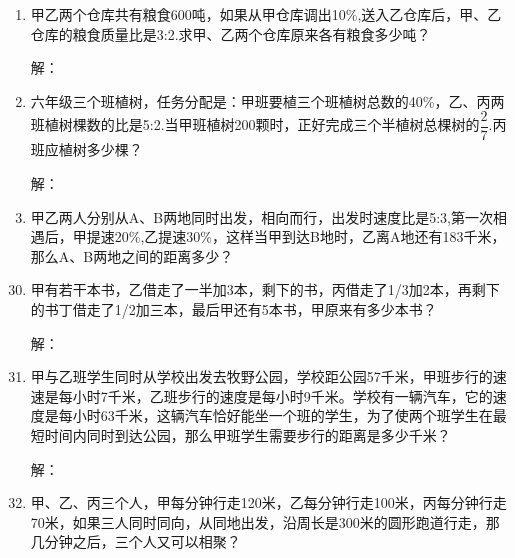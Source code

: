 \documentclass[twocolumn,landscape,UTF8]{ctexart}
\begin{document}
\begin{spacing}{1.3}
\begin{enumerate}
			\item 甲乙两个仓库共有粮食600吨，如果从甲仓库调出10\%,送入乙仓库后，甲、乙仓库的粮食质量比是3:2.求甲、乙两个仓库原来各有粮食多少吨？
			
           解：
            \vspace{3.5cm}
            
            \item 六年级三个班植树，任务分配是：甲班要植三个班植树总数的40\%，乙、丙两班植树棵数的比是5:2.当甲班植树200颗时，正好完成三个半植树总棵树的$\dfrac{2}{7}$.丙班应植树多少棵？

           解：
            \vspace{3.5cm}
            
            \item  甲乙两人分别从A、B两地同时出发，相向而行，出发时速度比是5:3,第一次相遇后，甲提速20\%,乙提速30\%，这样当甲到达B地时，乙离A地还有183千米，那么A、B两地之间的距离多少？            
		\end{enumerate}
	

	\end{spacing}
\newpage

\begin{enumerate}\setcounter{enumi}{29}
            

			\item 甲有若干本书，乙借走了一半加3本，剩下的书，丙借走了1/3加2本，再剩下的书丁借走了1/2加三本，最后甲还有5本书，甲原来有多少本书？
			
           解：
            \vspace{3.5cm}

            \item 甲与乙班学生同时从学校出发去牧野公园，学校距公园57千米，甲班步行的速速是每小时7千米，乙班步行的速度是每小时9千米。学校有一辆汽车，它的速度是每小时63千米，这辆汽车恰好能坐一个班的学生，为了使两个班学生在最短时间内同时到达公园，那么甲班学生需要步行的距离是多少千米？

           解：
            \vspace{3.5cm}

            \item  甲、乙、丙三个人，甲每分钟行走120米，乙每分钟行走100米，丙每分钟行走70米，如果三人同时同向，从同地出发，沿周长是300米的圆形跑道行走，那几分钟之后，三个人又可以相聚？
		\end{enumerate}
	\clearpage
	
\end{document}
